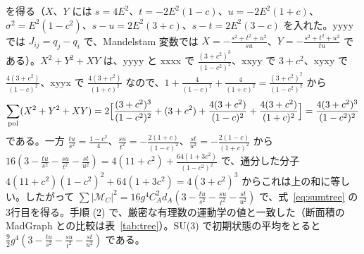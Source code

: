 \documentclass[a4paper,10pt]{ltjsarticle}
\begin{document}
を得る（$X$、$Y$ には $s=4E^2$、$t=-2E^2(1-c)$、$u=-2E^2(1+c)$、$\sigma^2=E^2(1-c^2)$、$s-u=2E^2(3+c)$、$s-t=2E^2(3-c)$ を入れた。yyyy では $J_{ij}=q_j-q_i$ で、Mandelstam 変数では $X=-\frac{s^2+t^2+u^2}{su}$、$Y=-\frac{s^2+t^2+u^2}{tu}$ である）。$X^2+Y^2+XY$ は、yyyy と xxxx で $\frac{(3+c^2)^3}{(1-c^2)^2}$、xxyy で $3+c^2$、xyxy で $\frac{4(3+c^2)}{(1-c)^2}$、xyyx で $\frac{4(3+c^2)}{(1+c)^2}$ なので、$1+\frac4{(1-c)^2}+\frac4{(1+c)^2}=\frac{(3+c^2)^2}{(1-c^2)^2}$ から
\begin{equation*}
\sum_{\mathrm{pol}}(X^2+Y^2+XY)=2\Bigl[\frac{(3+c^2)^3}{(1-c^2)^2}+(3+c^2)+\frac{4(3+c^2)}{(1-c)^2}+\frac{4(3+c^2)}{(1+c)^2}\Bigr]=\frac{4(3+c^2)^3}{(1-c^2)^2}
\end{equation*}
である。一方 $\frac{tu}{s^2}=\frac{1-c^2}4$、$\frac{su}{t^2}=-\frac{2(1+c)}{(1-c)^2}$、$\frac{st}{u^2}=-\frac{2(1-c)}{(1+c)^2}$ から $16(3-\frac{tu}{s^2}-\frac{su}{t^2}-\frac{st}{u^2})=4(11+c^2)+\frac{64(1+3c^2)}{(1-c^2)^2}$ で、通分した分子 $4(11+c^2)(1-c^2)^2+64(1+3c^2)=4(3+c^2)^3$ からこれは上の和に等しい。したがって $\sum|\mathcal M_C|^2=16g^4C_A^2d_A(3-\frac{tu}{s^2}-\frac{su}{t^2}-\frac{st}{u^2})$ で、式~\eqref{eq:sumtree} の3行目を得る。手順 (2) で、厳密な有理数の運動学の値と一致した（断面積の MadGraph との比較は表~\ref{tab:tree}）。SU(3) で初期状態の平均をとると $\frac92g^4(3-\frac{tu}{s^2}-\frac{su}{t^2}-\frac{st}{u^2})$ である。
\end{document}
